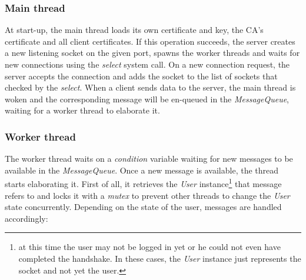 \subsubsection{Main thread}
At start-up, the main thread loads its own certificate and key, the CA's 
certificate and all client certificates. If this operation succeeds, the 
server creates a new listening socket on the given port, spawns the worker 
threads and waits for new connections using the \emph{select} system call.
On a new connection request, the server accepts the connection and adds the 
socket to the list of sockets that checked by the \emph{select}. When a client
sends data to the server, the main thread is woken and the corresponding 
message will be en-queued in the \emph{MessageQueue}, waiting for a worker
thread to elaborate it.

\subsubsection{Worker thread}
The worker thread waits on a \emph{condition} variable waiting for new messages
to be available in the \emph{MessageQueue}. Once a new message is available,
the thread starts elaborating it. First of all, it retrieves the \emph{User}
instance\footnote{at this time the user may not be logged in yet or he could 
not even have completed the handshake. In these cases, the \emph{User} instance
just represents the socket and not yet the user.} that message refers to and 
locks it with a \emph{mutex} to prevent other threads to change the \emph{User} 
state concurrently. Depending on the state of the user, messages are handled
accordingly:


